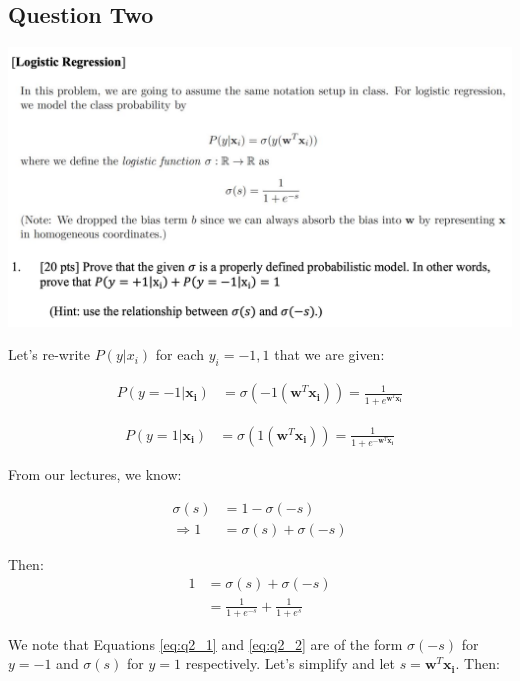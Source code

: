 \subsection{Question Two}
\includegraphics[width=1\textwidth]{media/hw4_q2.png}

Let's re-write $P(y|x_i)$ for each $y_i={-1,1}$ that we are given:

\begin{align}
    P(y=-1 | \mathbf{x_i}) &= \sigma(-1(\mathbf{w}^T \mathbf{x_i})) = \frac{1}{1+e^{\mathbf{w}^T \mathbf{x_i}}}\label{eq:q2_1}
\end{align} %

\begin{align}
    P(y=1 | \mathbf{x_i}) &= \sigma(1(\mathbf{w}^T \mathbf{x_i})) = \frac{1}{1+e^{-\mathbf{w}^T \mathbf{x_i}}} \label{eq:q2_2} 
\end{align} %

From our lectures, we know:

\begin{align}
    \sigma (s) &= 1 - \sigma(-s) \label{eq:q2_3} \nonumber \\
    \Rightarrow 1 &= \sigma(s) + \sigma(-s)
\end{align} %

Then: 
\begin{align}
    1 &= \sigma(s) + \sigma(-s) \label{eq:q2_4} \nonumber \\
    &= \frac{1}{1+e^{-s}} + \frac{1}{1+e^{s}} 
\end{align}

We note that Equations \ref{eq:q2_1} and \ref{eq:q2_2} are of the form $\sigma(-s)$ for $y=-1$ and $\sigma(s)$ for $y=1$ respectively. Let's simplify and let $s = \mathbf{w}^T \mathbf{x_i}$. Then:

